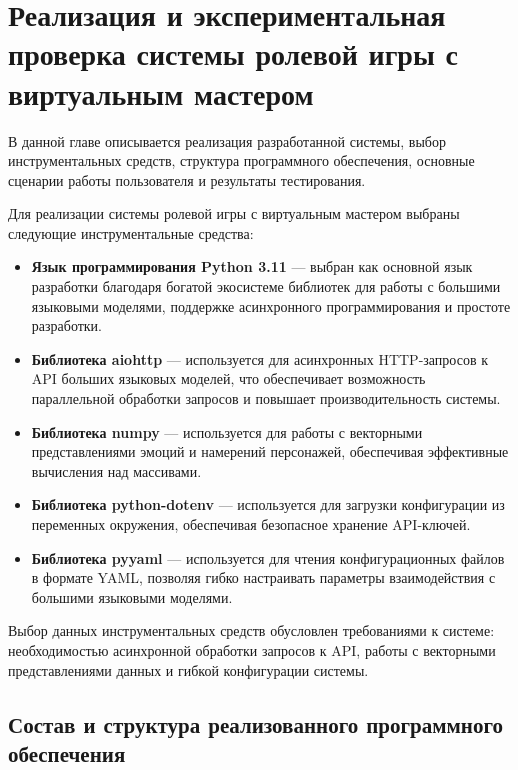 \chapter{Реализация и экспериментальная проверка системы ролевой игры с виртуальным мастером}

В данной главе описывается реализация разработанной системы, выбор инструментальных средств, структура программного обеспечения, основные сценарии работы пользователя и результаты тестирования.





Для реализации системы ролевой игры с виртуальным мастером выбраны следующие инструментальные средства:

\begin{itemize}
	\item \textbf{Язык программирования Python 3.11} --- выбран как основной язык разработки благодаря богатой экосистеме библиотек для работы с большими языковыми моделями, поддержке асинхронного программирования и простоте разработки.
	
	\item \textbf{Библиотека aiohttp} --- используется для асинхронных HTTP-запросов к API больших языковых моделей, что обеспечивает возможность параллельной обработки запросов и повышает производительность системы.
	
	\item \textbf{Библиотека numpy} --- используется для работы с векторными представлениями эмоций и намерений персонажей, обеспечивая эффективные вычисления над массивами.
	
	\item \textbf{Библиотека python-dotenv} --- используется для загрузки конфигурации из переменных окружения, обеспечивая безопасное хранение API-ключей.
	
	\item \textbf{Библиотека pyyaml} --- используется для чтения конфигурационных файлов в формате YAML, позволяя гибко настраивать параметры взаимодействия с большими языковыми моделями.
\end{itemize}

Выбор данных инструментальных средств обусловлен требованиями к системе: необходимостью асинхронной обработки запросов к API, работы с векторными представлениями данных и гибкой конфигурации системы.




\section{Состав и структура реализованного программного обеспечения}

